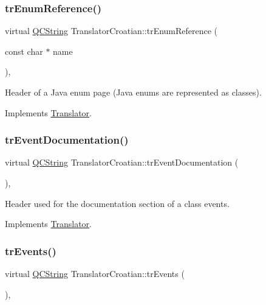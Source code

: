 \subsubsection{\texorpdfstring{trEnumReference()}{trEnumReference()}}
{\footnotesize\ttfamily virtual \mbox{\hyperlink{class_q_c_string}{Q\+C\+String}} Translator\+Croatian\+::tr\+Enum\+Reference (\begin{DoxyParamCaption}\item[{const char $\ast$}]{name }\end{DoxyParamCaption})\hspace{0.3cm}{\ttfamily [inline]}, {\ttfamily [virtual]}}

Header of a Java enum page (Java enums are represented as classes). 

Implements \mbox{\hyperlink{class_translator}{Translator}}.

\mbox{\label{class_translator_croatian_a9e35b757b69a0d6879f6abd64d8f91ca}} 
\subsubsection{\texorpdfstring{trEventDocumentation()}{trEventDocumentation()}}
{\footnotesize\ttfamily virtual \mbox{\hyperlink{class_q_c_string}{Q\+C\+String}} Translator\+Croatian\+::tr\+Event\+Documentation (\begin{DoxyParamCaption}{ }\end{DoxyParamCaption})\hspace{0.3cm}{\ttfamily [inline]}, {\ttfamily [virtual]}}

Header used for the documentation section of a class\textquotesingle{} events. 

Implements \mbox{\hyperlink{class_translator}{Translator}}.

\mbox{\label{class_translator_croatian_abc08e45d3be4d63c9a26f5b91f247d4b}} 
\subsubsection{\texorpdfstring{trEvents()}{trEvents()}}
{\footnotesize\ttfamily virtual \mbox{\hyperlink{class_q_c_string}{Q\+C\+String}} Translator\+Croatian\+::tr\+Events (\begin{DoxyParamCaption}{ }\end{DoxyParamCaption})\hspace{0.3cm}{\ttfamily [inline]}, {\ttfamily [virtual]}}

